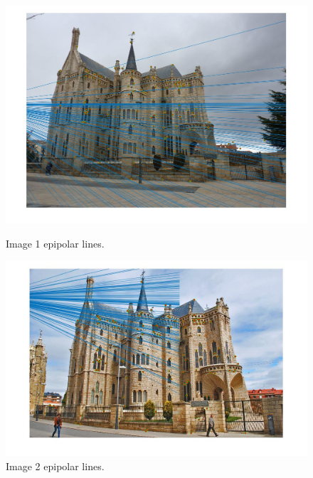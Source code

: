 \documentclass{article}
\begin{document}
\begin{center}
\begin{figure}[H]
  \centering
  \begin{minipage}[b]{0.4\textwidth}
    \includegraphics[scale=0.2]{episcopal_gaudi_img1_epipolar_lines.jpg}
    \caption{Image 1 epipolar lines.}
  \end{minipage}
  \hfill
  \begin{minipage}[b]{0.4\textwidth}
    \includegraphics[scale=0.2]{episcopal_gaudi_img2_epipolar_lines.jpg}
    \caption{Image 2 epipolar lines.}
  \end{minipage}
\end{figure}
\end{center}
\end{document}
